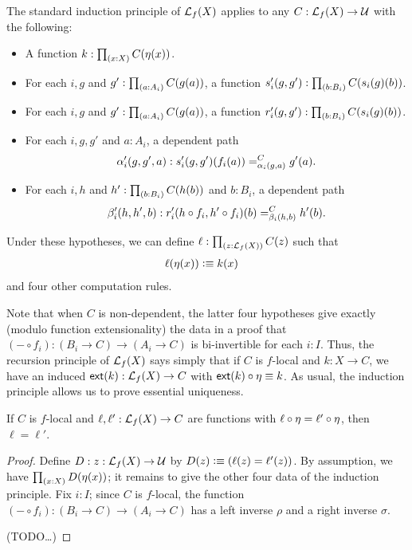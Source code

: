 The standard induction principle of $\loc f(X)$ applies to any $C:\loc f(X) \to \type$ with the following:
\begin{itemize}
\item A function $k:\prd{x:X} C(\mreturn(x))$.
\item For each $i,g$ and $g':\prd{a:A_i} C(g(a))$, a function $s'_{i}(g,g'):\prd{b:B_i} C(s_i(g)(b))$.
\item For each $i,g$ and $g':\prd{a:A_i} C(g(a))$, a function $r'_{i}(g,g'):\prd{b:B_i} C(s_i(g)(b))$.
\item For each $i,g,g'$ and $a:A_i$, a dependent path
  \[ \alpha'_i(g,g',a) : \dpath{C}{\alpha_i(g,a)}{s'_i(g,g')(f_i(a))}{g'(a)}. \]
\item For each $i,h$ and $h':\prd{b:B_i} C(h(b))$ and $b:B_i$, a dependent path
  \[ \beta'_i(h,h',b) : \dpath{C}{\beta_i(h,b)}{r'_i(h\circ f_i,h' \circ f_i)(b)}{h'(b)}. \]
\end{itemize}
Under these hypotheses, we can define $\ell:\prd{z:\loc f(X)} C(z)$ such that
\begin{align*}
  \ell(\mreturn(x)) &\defeq k(x)
\end{align*}
and four other computation rules.

Note that when $C$ is non-dependent, the latter four hypotheses give exactly (modulo function extensionality) the data in a proof that $(-\circ f_i) : (B_i \to C) \to (A_i\to C)$ is bi-invertible for each $i:I$.
Thus, the recursion principle of $\loc f(X)$ says simply that if $C$ is $f$-local and $k:X\to C$, we have an induced $\ext(k):\loc f(X)\to C$ with $\ext(k)\circ \mreturn \jdeq k$.
As usual, the induction principle allows us to prove essential uniqueness.

\begin{lem}\label{thm:local-eta}
  If $C$ is $f$-local and $\ell,\ell':\loc f(X) \to C$ are functions with $\ell\circ \mreturn = \ell'\circ\mreturn$, then $\ell=\ell'$.
\end{lem}
\begin{proof}
  Define $D:{z:\loc f(X)} \to \type$ by $D(z) \defeq (\ell(z)=\ell'(z))$.
  By assumption, we have $\prd{x:X} D(\mreturn(x))$; it remains to give the other four data of the induction principle.
  Fix $i:I$; since $C$ is $f$-local, the function $(-\circ f_i):(B_i\to C) \to (A_i\to C)$ has a left inverse $\rho$ and a right inverse $\sigma$.

  (TODO\dots)
\end{proof}

